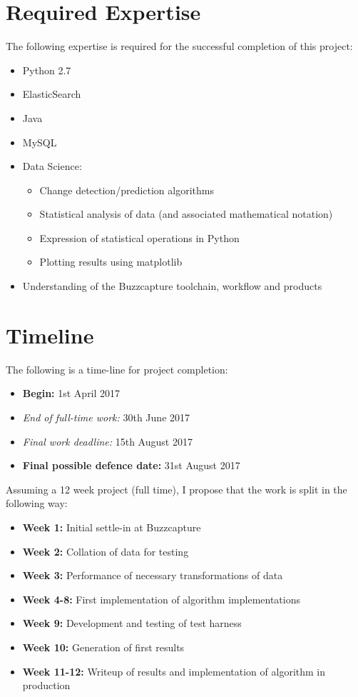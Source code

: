 \documentclass{uvamscse}
\begin{document}
\section{Required Expertise}

The following expertise is required for the successful completion of this project: 

\begin{itemize}
	\item Python 2.7
	\item ElasticSearch
	\item Java
	\item MySQL
	\item Data Science:
	\begin{itemize}
		\item Change detection/prediction algorithms
		\item Statistical analysis of data (and associated mathematical notation)
		\item Expression of statistical operations in Python
		\item Plotting results using matplotlib
	\end{itemize}
	\item Understanding of the Buzzcapture toolchain, workflow and products
\end{itemize}

\section{Timeline}

The following is a time-line for project completion: 

\begin{itemize}
\item \textbf{Begin:} 1st April 2017
\item \textit{End of full-time work:} 30th June 2017
\item \textit{Final work deadline:} 15th August 2017
\item \textbf{Final possible defence date:} 31st August 2017
\end{itemize}

Assuming a 12 week project (full time), I propose that the work is split in the following way: 

\begin{itemize}
\item \textbf{Week 1:} Initial settle-in at Buzzcapture
\item \textbf{Week 2:} Collation of data for testing
\item \textbf{Week 3:} Performance of necessary transformations of data
\item \textbf{Week 4-8:} First implementation of algorithm implementations
\item \textbf{Week 9:} Development and testing of test harness
\item \textbf{Week 10:} Generation of first results
\item \textbf{Week 11-12:} Writeup of results and implementation of algorithm in production
\end{itemize}
\end{document}
